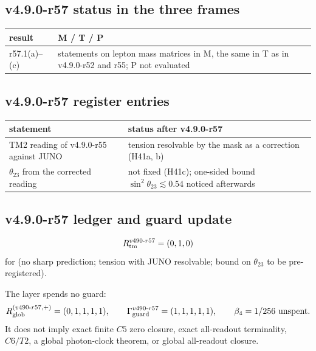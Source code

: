 \subsection*{v4.9.0-r57 status in the three frames}
\label{subsec:v490-r57-frames}

\begin{center}
\small
\begin{tabular}{@{}>{\raggedright\arraybackslash}p{}>{\raggedright\arraybackslash}p{}@{}}
\toprule
result & M / T / P\\
\midrule
r57.1(a)--(c) & statements on lepton mass matrices in M, the same in T as in v4.9.0-r52 and r55; P not evaluated\\
\bottomrule
\end{tabular}
\end{center}

\subsection*{v4.9.0-r57 register entries}
\label{subsec:v490-r57-register}

\begin{center}
\small
\begin{tabular}{@{}>{\raggedright\arraybackslash}p{}>{\raggedright\arraybackslash}p{}@{}}
\toprule
statement & status after v4.9.0-r57\\
\midrule
TM2 reading of v4.9.0-r55 against JUNO & tension resolvable by the mask as a correction (H41a, b)\\
\(\theta_{23}\) from the corrected reading & not fixed (H41c); one-sided bound \(\sin^2\theta_{23}\lesssim0.54\) noticed afterwards\\
\bottomrule
\end{tabular}
\end{center}

\subsection*{v4.9.0-r57 ledger and guard update}
\label{subsec:v490-r57-ledger-guard}

\[
R_{\rm tm}^{v490\text{-}r57}=(0,1,0)
\]
for (no sharp prediction; tension with JUNO resolvable; bound on \(\theta_{23}\) to be pre-registered).

The layer spends no guard:
\[
R_{\rm glob}^{(v490\text{-}r57,+)}=(0,1,1,1,1),
\qquad
\Gamma_{\rm guard}^{v490\text{-}r57}=(1,1,1,1,1),
\qquad
\beta_4=1/256\ \text{unspent}.
\]
It does not imply exact finite \(C5\) zero closure, exact all-readout terminality,
\(C6/T2\), a global photon-clock theorem, or global all-readout closure.

